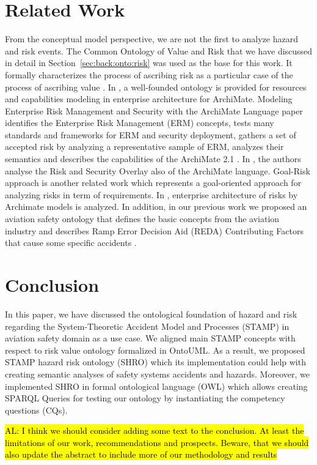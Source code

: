 \documentclass[sw]{iosart2x}
\newcommand{\COMMENT}[1]{\hl{ \textnormal{#1}}}
\newcommand{\COMMENT}[2]{\hl{ \textnormal{#1} \textbf{comment:} \textit{#2}}\xspace}
\newcommand{\term}[1]{\textnormal{\textsf{#1}}}
\begin{document}
\section{Related Work}
From the conceptual model perspective, we are not the first to analyze hazard and risk events. The Common Ontology of Value and Risk that we have discussed in detail in Section~\ref{sec:back:onto:risk} was used as the base for this work. It formally characterizes the process of ascribing risk as a particular case of the process of ascribing value \cite{unknown}. In \cite{6658262}, a well-founded ontology is provided for resources and capabilities modeling in enterprise architecture for ArchiMate. Modeling Enterprise Risk Management and Security with the ArchiMate Language paper identifies the Enterprise Risk Management (ERM) concepts, tests many standards and frameworks for ERM and security deployment, gathers a set of accepted risk by analyzing a representative sample of ERM, analyzes their semantics and describes the capabilities of the ArchiMate 2.1 \cite{d2d92390811345be868098a06f243a96}. In \cite{8089840}, the authors analyse the Risk and Security Overlay also of the ArchiMate language. Goal-Risk approach \cite{Asnar:2011:GRA:1999080.1999082} is another related work which represents a goal-oriented approach for analyzing risks in term of requirements. In \cite{d2d92390811345be868098a06f243a96}, enterprise architecture of risks by Archimate models is analyzed. In addition, in our previous work we proposed an aviation safety ontology that defines the basic concepts from the aviation industry and describes Ramp Error Decision Aid (REDA) Contributing Factors that cause some specific accidents \cite{Kostov2017b}.

\section{Conclusion}
In this paper, we have discussed the ontological foundation of hazard and risk regarding the System-Theoretic Accident Model and Processes (STAMP) in aviation safety domain as a use case. We aligned main STAMP concepts with respect to risk value ontology formalized in OntoUML.
As a result, we proposed STAMP hazard risk ontology (SHRO) which its implementation could help with creating semantic analyses of safety systems accidents and hazards. Moreover, we implemented SHRO in formal ontological language (OWL) which allows creating SPARQL Queries for testing our ontology by instantiating the competency questions \term{(CQs)}.  

\COMMENT{ AL: I think we should consider adding some text to the conclusion. At least the limitations of our work, recommendations and prospects. Beware, that we should also update the abstract to include more of our methodology and results}

\end{document}
